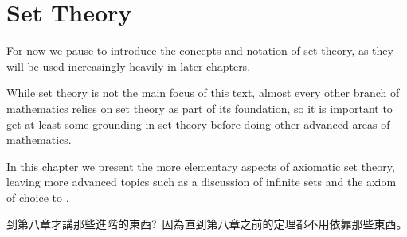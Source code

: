 \chapter{Set Theory} \label{ch3}

For now we pause to introduce the concepts and notation of set theory, as they will be used increasingly heavily in
later chapters.

While set theory is not the main focus of this text, almost every other branch of mathematics relies on set theory as part of its foundation, so it is important to get at least some grounding in set theory before doing other advanced areas of mathematics.

In this chapter we present the more elementary aspects of axiomatic set theory, leaving more advanced topics such as a discussion of infinite sets and the axiom of choice to
.

\begin{note}
到第八章才講那些進階的東西?\ 因為直到第八章之前的定理都不用依靠那些東西。
\end{note}



